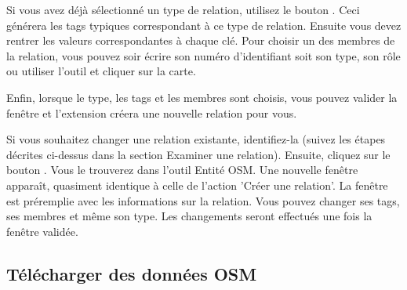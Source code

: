 Si vous avez déjà sélectionné un type de relation, utilisez le bouton . Ceci générera les tags typiques correspondant à ce type de relation. Ensuite vous devez rentrer les valeurs correspondantes à chaque clé. Pour choisir un des membres de la relation, vous pouvez soir écrire son numéro d'identifiant soit son type, son rôle ou utiliser l'outil  et cliquer sur la carte.

Enfin, lorsque le type, les tags et les membres sont choisis, vous pouvez valider la fenêtre et l'extension créera une nouvelle relation pour vous.


Si vous souhaitez changer une relation existante, identifiez-la (suivez les étapes décrites ci-dessus dans la section \og Examiner une relation\fg). Ensuite, cliquez sur le bouton . Vous le trouverez dans l'outil Entité OSM. Une nouvelle fenêtre apparaît, quasiment identique à celle de l'action 'Créer une relation'. La fenêtre est préremplie avec les informations sur la relation. Vous pouvez changer ses tags, ses membres et même son type. Les changements seront effectués une fois la fenêtre validée.

\subsection{Télécharger des données OSM}  


